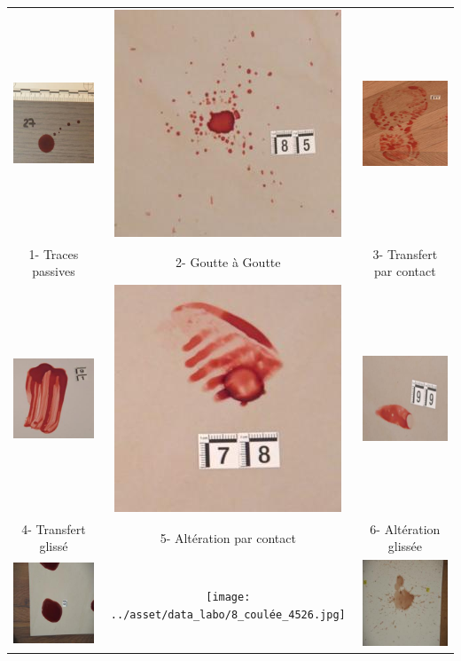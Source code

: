 \documentclass[a4paper]{article}
\begin{document}
\begin{table}[ht]
    \centering
    \begin{tabular}{ccc}
        \includegraphics[width=0.15\linewidth]{../asset/data_labo/1_bois_350.jpg} & \includegraphics[width=0.15\linewidth]{../asset/data_labo/2_carrelage_523.jpg}& \includegraphics[width=0.15\linewidth]{../asset/data_labo/3_lino_888.jpg} \\
        1- Traces passives & 2- Goutte à Goutte & 3- Transfert par contact \\
        \includegraphics[width=0.15\linewidth]{../asset/data_labo/4_papier_1586.jpg} & \includegraphics[width=0.15\linewidth]{../asset/data_labo/5_carrelage_5605.jpg} & \includegraphics[width=0.15\linewidth]{../asset/data_labo/6_bois_604.jpg} \\
        4- Transfert glissé & 5- Altération par contact & 6- Altération glissée \\
        \includegraphics[width=0.15\linewidth]{../asset/data_labo/7_carrelage_5507.jpg} & \texttt{[image: ../asset/data\_labo/8\_coulée\_4526.jpg]} & \includegraphics[width=0.15\linewidth]{../asset/data_labo/9_papier_6375.jpg} \\

\end{tabular}
\end{table}
\end{document}
